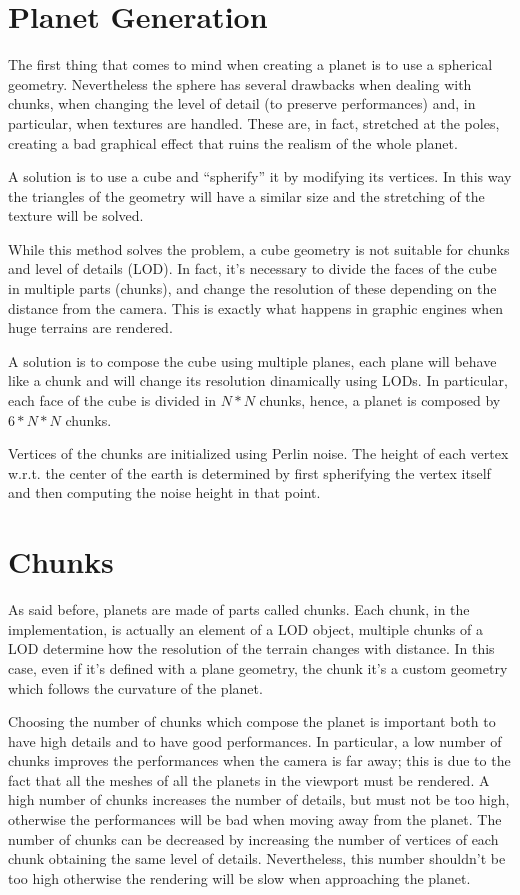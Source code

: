 \documentclass[paper=a4, fontsize=11pt]{scrartcl} %
\numberwithin{equation}{section} %
\numberwithin{figure}{section} %
\numberwithin{table}{section} %
\theoremstyle{definition}
\begin{document}
\section{Planet Generation}

The first thing that comes to mind when creating a planet is to use a spherical
geometry. Nevertheless the sphere has several drawbacks when dealing with
chunks, when changing the level of detail (to preserve performances) and, in
particular, when textures are handled. These are, in fact, stretched at the poles,
creating a bad graphical effect that ruins the realism of the whole planet.

A solution is to use a cube and ``spherify'' it by modifying its vertices.
In this way the triangles of the geometry will have a similar size and the
stretching of the texture will be solved.

While this method solves the problem, a cube geometry is not suitable for chunks
and level of details (LOD). In fact, it's
necessary to divide the faces of the cube in multiple parts (chunks),
and change the resolution of these depending on the distance from the camera.
This is exactly what happens in graphic engines when huge terrains are
rendered.

A solution is to compose the cube using multiple planes, each plane will
behave like a chunk and will change its resolution dinamically using LODs.
In particular, each face of the cube is divided in $N*N$ chunks, hence, a
planet is composed by $6*N*N$ chunks.

Vertices of the chunks are initialized using Perlin noise. The height of each
vertex w.r.t. the center of the earth is determined by first spherifying the
vertex itself and then computing the noise height in that point.


\section{Chunks}

As said before, planets are made of parts called chunks. Each chunk, in the
implementation, is actually an element of a LOD object, multiple chunks of a
LOD determine how the resolution of the terrain changes with distance.
In this case, even if it's defined with a plane geometry, the chunk it's
a custom geometry which follows the curvature of the planet.

Choosing the number of chunks which compose the planet is important both to
have high details and to have good performances. In particular, a low number
of chunks improves the performances when the camera is far away; this is due
to the fact that all the meshes of all the planets in the viewport must be
rendered. A high number of chunks increases the number of details, but
must not be too high, otherwise the performances will be bad when moving away
from the planet. The number of chunks can be decreased by increasing the
number of vertices of each chunk obtaining the same level of details.
Nevertheless, this number shouldn't be
too high otherwise the rendering will be slow when approaching the planet. 
\end{document}
